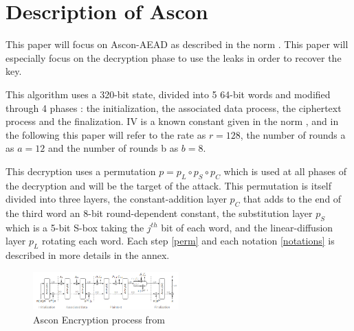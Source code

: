 \documentclass[a4paper,11pt,twocolumn]{article}
\begin{document}
	\section{Description of Ascon}
	This paper will focus on Ascon-AEAD as described in the norm \cite{norme}. This paper will especially focus on the decryption phase to use the leaks in order to recover the key.
	
	\begin{algorithm}[h]
	\end{algorithm}
	
	This algorithm uses a 320-bit state, divided into 5 64-bit words and modified through 4 phases : the initialization, the associated data process, the ciphertext process and the finalization. IV is a known constant given in the norm \cite{norme}, and in the following this paper will refer to the rate as $r=128$, the number of rounds a as $a=12$ and the number of rounds b as $b=8$.
	
	
	This decryption uses a permutation $p = p_L \circ p_S \circ p_C$ which is used at all phases of the decryption and will be the target of the attack. This permutation is itself divided into three layers, the constant-addition layer $p_C$ that adds to the end of the third word an 8-bit round-dependent constant, the substitution layer $p_S$ which is a 5-bit S-box taking the $j^{th}$ bit of each word, and the linear-diffusion layer $p_L$ rotating each word. Each step \ref{perm} and each notation \ref{notations} is described in more details in the annex.
	
	\begin{figure}[h]
		\centering
		\includegraphics[width=0.5\textwidth]{encryption}
		\caption{Ascon Encryption process from \cite{norme}}
		\label{fig:enc}
	\end{figure}
	
\end{document}
